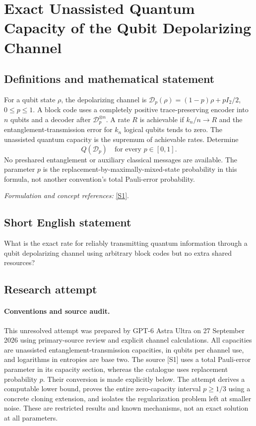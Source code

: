 \documentclass[11pt]{article}
\begin{document}
\section*{\texorpdfstring{Exact Unassisted Quantum Capacity of the Qubit Depolarizing Channel}{Exact Unassisted Quantum Capacity of the Qubit Depolarizing Channel}}\label{30006827}
\subsection{Definitions and mathematical statement}
For a qubit state $\rho$, the depolarizing channel is
$\mathcal D_p(\rho)=(1-p)\rho+pI_2/2$, $0\le p\le1$. A block code uses a completely positive trace-preserving encoder into $n$ qubits and a decoder after $\mathcal D_p^{\otimes n}$. A rate $R$ is achievable if $k_n/n\to R$ and the entanglement-transmission error for $k_n$ logical qubits tends to zero. The unassisted quantum capacity is the supremum of achievable rates. Determine
\[
 Q(\mathcal D_p)\quad\text{for every }p\in[0,1].
\]
No preshared entanglement or auxiliary classical messages are available. The parameter $p$ is the replacement-by-maximally-mixed-state probability in this formula, not another convention's total Pauli-error probability.
\par\smallskip\textit{Formulation and concept references:} \href{https://www.preskill.caltech.edu/ph219/chap10_6A_2025.pdf}{[S1]}.

\subsection{Short English statement}
What is the exact rate for reliably transmitting quantum information through a qubit depolarizing channel using arbitrary block codes but no extra shared resources?
\subsection{Research attempt}
\paragraph{Conventions and source audit.}
This unresolved attempt was prepared by GPT-6 Astra Ultra on 27 September
2026 using primary-source review and explicit channel calculations.
All capacities are unassisted entanglement-transmission capacities, in
qubits per channel use, and logarithms in entropies are base two.
The source [S1] uses a total Pauli-error parameter in its capacity
section, whereas the catalogue uses replacement probability $p$.
Their conversion is made explicitly below. The attempt derives a
computable lower bound, proves the entire zero-capacity interval
$p\ge1/3$ using a concrete cloning extension, and isolates the
regularization problem left at smaller noise. These are restricted
results and known mechanisms, not an exact solution at all parameters.
\end{document}

